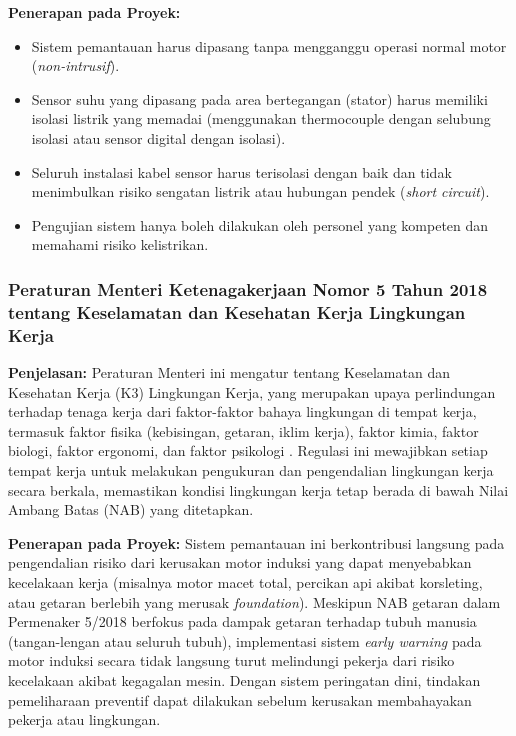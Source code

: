 \documentclass{elsinta}
\begin{document}
\textbf{Penerapan pada Proyek:}
\begin{itemize}
    \item Sistem pemantauan harus dipasang tanpa mengganggu operasi normal motor (\textit{non-intrusif}).
    \item Sensor suhu yang dipasang pada area bertegangan (stator) harus memiliki isolasi listrik yang memadai (menggunakan thermocouple dengan selubung isolasi atau sensor digital dengan isolasi).
    \item Seluruh instalasi kabel sensor harus terisolasi dengan baik dan tidak menimbulkan risiko sengatan listrik atau hubungan pendek (\textit{short circuit}).
    \item Pengujian sistem hanya boleh dilakukan oleh personel yang kompeten dan memahami risiko kelistrikan.
\end{itemize}

\subsubsection{Peraturan Menteri Ketenagakerjaan Nomor 5 Tahun 2018 tentang Keselamatan dan Kesehatan Kerja Lingkungan Kerja}

\textbf{Penjelasan:} Peraturan Menteri ini mengatur tentang Keselamatan dan Kesehatan Kerja (K3) Lingkungan Kerja, yang merupakan upaya perlindungan terhadap tenaga kerja dari faktor-faktor bahaya lingkungan di tempat kerja, termasuk faktor fisika (kebisingan, getaran, iklim kerja), faktor kimia, faktor biologi, faktor ergonomi, dan faktor psikologi \cite{permenaker5_2018}. Regulasi ini mewajibkan setiap tempat kerja untuk melakukan pengukuran dan pengendalian lingkungan kerja secara berkala, memastikan kondisi lingkungan kerja tetap berada di bawah Nilai Ambang Batas (NAB) yang ditetapkan.

\textbf{Penerapan pada Proyek:} Sistem pemantauan ini berkontribusi langsung pada pengendalian risiko dari kerusakan motor induksi yang dapat menyebabkan kecelakaan kerja (misalnya motor macet total, percikan api akibat korsleting, atau getaran berlebih yang merusak \textit{foundation}). Meskipun NAB getaran dalam Permenaker 5/2018 berfokus pada dampak getaran terhadap tubuh manusia (tangan-lengan atau seluruh tubuh), implementasi sistem \textit{early warning} pada motor induksi secara tidak langsung turut melindungi pekerja dari risiko kecelakaan akibat kegagalan mesin. Dengan sistem peringatan dini, tindakan pemeliharaan preventif dapat dilakukan sebelum kerusakan membahayakan pekerja atau lingkungan.
\end{document}

